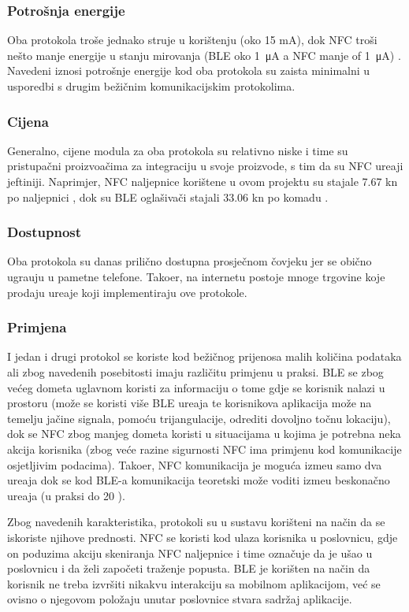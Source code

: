 \subsubsection{Potro\v{s}nja energije}
Oba protokola tro\v{s}e jednako struje u kori\v{s}tenju (oko 15 mA), dok NFC tro\v{s}i ne\v{s}to manje energije u stanju mirovanja (BLE oko \SI{1}{\micro\ampere} a NFC manje of \SI{1}{\micro\ampere}) \cite{mobilePayments}. Navedeni iznosi potro\v{s}nje energije kod oba protokola su zaista minimalni u usporedbi s drugim be\v{z}i\v{c}nim komunikacijskim protokolima.


\subsubsection{Cijena}
Generalno, cijene modula za oba protokola su relativno niske i time su pristupa\v{c}ni proizvo\dj a\v{c}ima za integraciju u svoje proizvode, s tim da su NFC ure\dj aji jeftiniji. Naprimjer, NFC naljepnice kori\v{s}tene u ovom projektu su stajale 7.67 kn po naljepnici \cite{whiztags}, dok su BLE ogla\v{s}iva\v{c}i stajali 33.06 kn po komadu \cite{gimbal_beacon}.

\subsubsection{Dostupnost}
Oba protokola su danas prili\v{c}no dostupna prosje\v{c}nom \v{c}ovjeku jer se obi\v{c}no ugra\dj uju u pametne telefone. Tako\dj er, na internetu postoje mnoge trgovine koje prodaju ure\dj aje koji implementiraju ove protokole.

\subsubsection{Primjena}
I jedan i drugi protokol se koriste kod be\v{z}i\v{c}nog prijenosa malih koli\v{c}ina podataka ali zbog navedenih posebitosti imaju razli\v{c}itu primjenu u praksi. BLE se zbog ve\'{c}eg dometa uglavnom koristi za informaciju o tome gdje se korisnik nalazi u prostoru (mo\v{z}e se koristi vi\v{s}e BLE ure\dj aja te korisnikova aplikacija mo\v{z}e na temelju ja\v{c}ine signala, pomo\'{c}u trijangulacije, odrediti dovoljno to\v{c}nu lokaciju), dok se NFC zbog manjeg dometa koristi u situacijama u kojima je potrebna neka akcija korisnika (zbog ve\'{c}e razine sigurnosti NFC ima primjenu kod komunikacije osjetljivim podacima). Tako\dj er, NFC komunikacija je mogu\'{c}a izme\dj u samo dva ure\dj aja dok se kod BLE-a komunikacija teoretski mo\v{z}e voditi izme\dj u beskona\v{c}no ure\dj aja (u praksi do 20 \cite{mobilePayments}). 

Zbog navedenih karakteristika, protokoli su u sustavu kori\v{s}teni na na\v{c}in da se iskoriste njihove prednosti. NFC se koristi kod ulaza korisnika u poslovnicu, gdje on poduzima akciju skeniranja NFC naljepnice i time ozna\v{c}uje da je u\v{s}ao u poslovnicu i da \v{z}eli zapo\v{c}eti tra\v{z}enje popusta. BLE je kori\v{s}ten na na\v{c}in da korisnik ne treba izvr\v{s}iti nikakvu interakciju sa mobilnom aplikacijom, ve\'{c} se ovisno o njegovom polo\v{z}aju unutar poslovnice stvara sadr\v{z}aj aplikacije.








